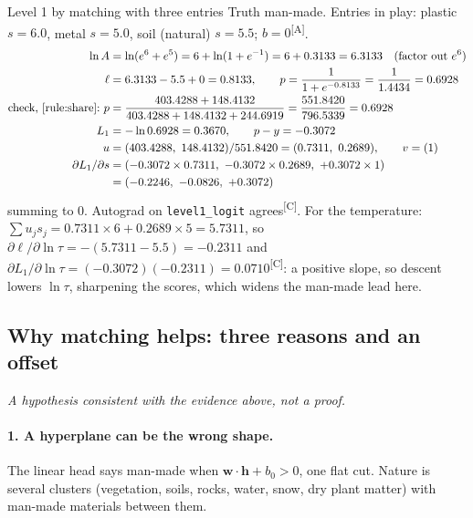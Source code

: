 \documentclass[11pt,a4paper,oneside,openany]{book}
\newcommand{\B}[1]{{\symbf{#1}}}
\newcommand{\B}[1]{{\bm{#1}}}
\newcommand{\comp}{\textsuperscript{\textsf{\scriptsize[C]}}}
\newcommand{\assm}{\textsuperscript{\textsf{\scriptsize[A]}}}
\newcommand{\vw}{\B{w}}
\newcommand{\vh}{\B{h}}
\begin{document}
\begin{worked}[label=we:asbuilt:l1]{Level 1 by matching with three entries}
Truth man-made. Entries in play: plastic $s=6.0$, metal $s=5.0$, soil (natural) $s=5.5$; $b=0$\assm.
\begin{align*}
\ln A &= \ln(e^{6}+e^{5}) = 6+\ln(1+e^{-1}) = 6+0.3133 = 6.3133 \quad\text{(factor out $e^{6}$)}\\
\ell &= 6.3133-5.5+0 = 0.8133,\qquad p=\frac{1}{1+e^{-0.8133}}=\frac{1}{1.4434}=0.6928\\
\text{check, \cref{rule:share}:}\ p &= \frac{403.4288+148.4132}{403.4288+148.4132+244.6919}=\frac{551.8420}{796.5339}=0.6928\\
L_1 &= -\ln0.6928 = 0.3670,\qquad p-y=-0.3072\\
u &= (403.4288,\ 148.4132)/551.8420=(0.7311,\ 0.2689),\qquad v=(1)\\
\partial L_1/\partial s &= (-0.3072\times0.7311,\ -0.3072\times0.2689,\ +0.3072\times1)\\
&= (-0.2246,\ -0.0826,\ +0.3072)
\end{align*}
summing to 0. Autograd on \texttt{level1\_logit} agrees\comp. For the temperature: $\sum u_js_j=0.7311\times6+0.2689\times5=5.7311$, so
$\partial\ell/\partial\ln\tau=-(5.7311-5.5)=-0.2311$ and $\partial L_1/\partial\ln\tau=(-0.3072)(-0.2311)=0.0710$\comp: a positive slope, so descent lowers $\ln\tau$,
sharpening the scores, which widens the man-made lead here.
\end{worked}

\subsection{Why matching helps: three reasons and an offset}

\emph{A hypothesis consistent with the evidence above, not a proof.}

\paragraph{1. A hyperplane can be the wrong shape.} The linear head says man-made when $\vw\cdot\vh+b_0>0$, one flat cut. Nature is several clusters (vegetation, soils,
rocks, water, snow, dry plant matter) with man-made materials between them.
\end{document}
